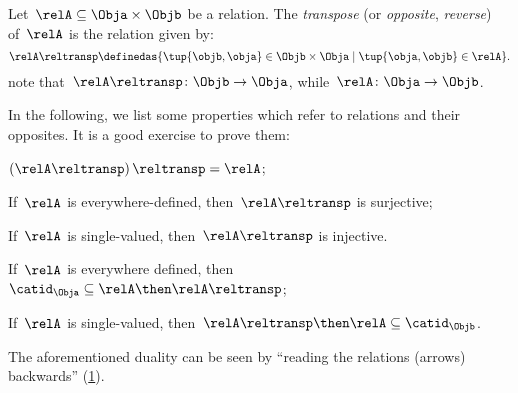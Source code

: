 \begin{definition}
  \label{def:relation-transpose}
  Let~$\relA\subseteq \Obja\times \Objb$ be a relation. The \emph{transpose} (or \emph{opposite}, \emph{reverse}) of~$\relA$ is the relation given by:
  \begin{equation*}
    \relA\reltransp \definedas \{\tup{\objb,\obja}\in \Objb\times \Obja \mid \tup{\obja,\objb}\in \relA \}.
  \end{equation*}
  note that~$\relA\reltransp\colon \Objb\to \Obja$, while~$\relA\colon \Obja\to \Objb$.
\end{definition}
\begin{remark}
  In the following, we list some properties which refer to relations and their opposites. It is a good exercise to prove them:
  \begin{compactitem}
    \item $\left(\relA\reltransp\right)\reltransp = \relA $;
    \item If~$\relA$ is everywhere-defined, then~$\relA\reltransp$ is surjective;
    \item If~$\relA$ is single-valued, then~$\relA\reltransp$ is injective.
    \item If~$\relA$ is everywhere defined, then~$\catid_\Obja\subseteq \relA\then \relA\reltransp$;
    \item If~$\relA$ is single-valued, then~$\relA\reltransp\then \relA\subseteq \catid_\Objb$.
  \end{compactitem}
\end{remark}

\begin{remark}
  The aforementioned duality can be seen by ``reading the relations (arrows) backwards'' (\cref{fig:rel_transpose}).
\end{remark}

\begin{figure}[h!]
  \centering
  \caption{}
  \label{fig:rel_transpose}
\end{figure}
